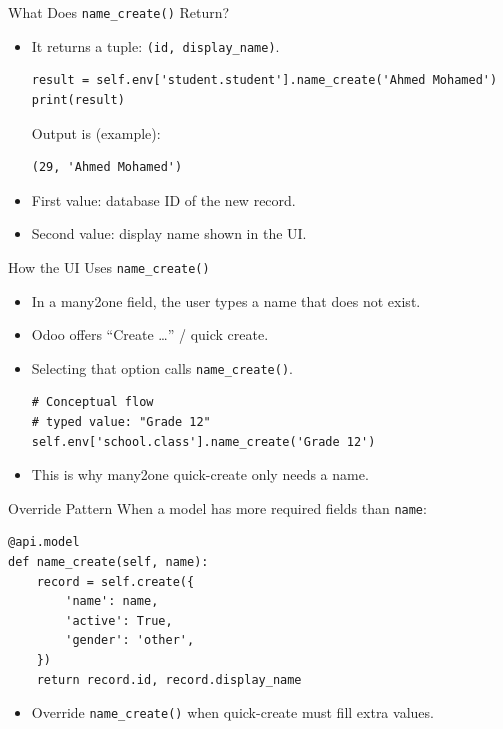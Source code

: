 \begin{frame}[fragile]{What Does \texttt{name\_create()} Return?}
	\begin{block}{}
		\begin{itemize}
			\item It returns a tuple: \texttt{(id, display\_name)}.
\begin{lstlisting}
result = self.env['student.student'].name_create('Ahmed Mohamed')
print(result)
\end{lstlisting}
			Output is (example):
\begin{lstlisting}
(29, 'Ahmed Mohamed')
\end{lstlisting}
			\item First value: database ID of the new record.
			\item Second value: display name shown in the UI.
		\end{itemize}
	\end{block}
\end{frame}

\begin{frame}[fragile]{How the UI Uses \texttt{name\_create()}}
	\begin{itemize}
		\item In a many2one field, the user types a name that does not exist.
		\item Odoo offers ``Create \ldots'' / quick create.
		\item Selecting that option calls \texttt{name\_create()}.
\begin{lstlisting}
# Conceptual flow
# typed value: "Grade 12"
self.env['school.class'].name_create('Grade 12')
\end{lstlisting}
		\item This is why many2one quick-create only needs a name.
	\end{itemize}
\end{frame}

\begin{frame}[fragile]{Override Pattern}
	When a model has more required fields than \texttt{name}:
\begin{lstlisting}
@api.model
def name_create(self, name):
	record = self.create({
		'name': name,
		'active': True,
		'gender': 'other',
	})
	return record.id, record.display_name
\end{lstlisting}
	\begin{itemize}
		\item Override \texttt{name\_create()} when quick-create must fill extra values.
	\end{itemize}
\end{frame}

